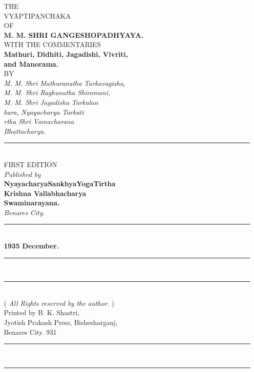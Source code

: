 \documentclass[10pt, openany]{book}
\begin{document}
\doublespacing
\cfoot{}
\begin{center}
\en
THE\\
\vspace{3mm}
 {\Huge VYĀPTIPANCHAKA}\\
{\small OF}\\
\textbf{M. M. SHRI GANGESHOPADHYAYA.}\\
WITH THE COMMENTARIES\\
\textbf{Mathuri, Didhiti, Jagadishi, Vivriti,} \\
\textbf{and Manorama.} \\
{\small BY}\\
{\en \textit{M. M. Shri Mathuranatha Tarkavagisha,} \\
\textit{M. M. Shri Raghunatha Shiromani,} \\
\textit{M. M. Shri Jagadisha Tarkalan\textendash} \\
\textit{kara, Nyayacharya Tarkati\textendash} \\
\textit{rtha Shri Vamacharana\textendash} \\
\textit{Bhattacharya.}} \\
\vspace{2mm}
\rule{.05\linewidth}{.5pt}\\
\vspace{2mm}
FIRST EDITION\textemdash\\
\vspace{3mm}
{\en \textit{Published by}}\\
\textbf{Nyayacharya\textendash Sankhya\textendash Yoga\textendash Tirtha\textendash}\\
\textbf{Krishna Vallabhacharya\textendash}\\ 
\textbf{Swaminarayana.}\\ 
{\en \textit{Benares City.}}\\
\vspace{2mm}
\rule{.05\linewidth}{.5pt}\\
\vspace{2mm}
\textbf{1935 December.}
\end{center}
\newpage
\vspace*{\fill}
\begin{center}
\en
\rule{\linewidth}{3pt}\\
\vspace{-5mm}
\rule{\linewidth}{.5pt}\\
( {\en \textit{All Rights reserved by the author.}} ) \\
Printed by B. K. Shastri,\\
Jyotish Prakash Press,
Bishesharganj,\\
Benares City. 931\\
\rule{\linewidth}{.5pt}\\
\vspace{-4mm}
\rule{\linewidth}{3pt}
\end{center}
\end{document}
